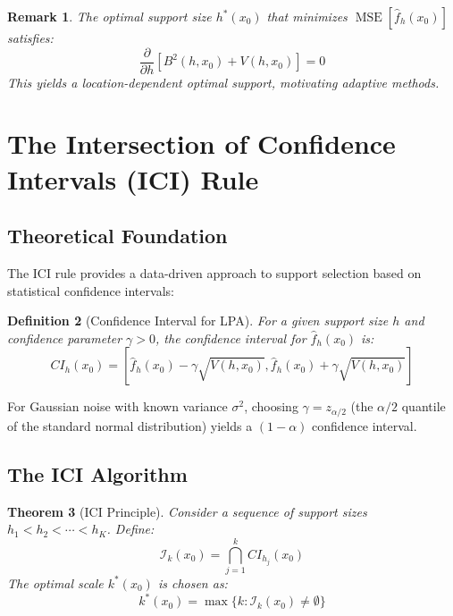 \documentclass[12pt]{article}
\DeclareMathOperator{\MSE}{MSE}
\newtheorem{theorem}{Theorem}[section]
\newtheorem{definition}[theorem]{Definition}
\newtheorem{remark}[theorem]{Remark}
\begin{document}
\begin{remark}
    The optimal support size $h^*(x_0)$ that minimizes $\MSE[\hat{f}_h(x_0)]$ satisfies:
    \begin{equation}
        \frac{\partial}{\partial h} \left[ B^2(h, x_0) + V(h, x_0) \right] = 0
        \label{eq:optimal_h}
    \end{equation}
    This yields a location-dependent optimal support, motivating adaptive methods.
\end{remark}

\newpage

\section{The Intersection of Confidence Intervals (ICI) Rule}

\subsection{Theoretical Foundation}

The ICI rule provides a data-driven approach to support selection based on statistical confidence intervals:

\begin{definition}[Confidence Interval for LPA]
    For a given support size $h$ and confidence parameter $\gamma > 0$, the confidence interval for $\hat{f}_h(x_0)$ is:
    \begin{equation}
        CI_h(x_0) = \left[ \hat{f}_h(x_0) - \gamma \sqrt{V(h, x_0)}, \hat{f}_h(x_0) + \gamma \sqrt{V(h, x_0)} \right]
        \label{eq:confidence_interval}
    \end{equation}
\end{definition}

For Gaussian noise with known variance $\sigma^2$, choosing $\gamma = z_{\alpha/2}$ (the $\alpha/2$ quantile of the standard normal distribution) yields a $(1-\alpha)$ confidence interval.

\subsection{The ICI Algorithm}

\begin{theorem}[ICI Principle]
    \label{thm:ici_principle}
    Consider a sequence of support sizes $h_1 < h_2 < \cdots < h_K$. Define:
    \begin{equation}
        \mathcal{I}_k(x_0) = \bigcap_{j=1}^{k} CI_{h_j}(x_0)
        \label{eq:intersection}
    \end{equation}
    The optimal scale $k^*(x_0)$ is chosen as:
    \begin{equation}
        k^*(x_0) = \max\{k : \mathcal{I}_k(x_0) \neq \emptyset\}
        \label{eq:optimal_scale}
    \end{equation}
\end{theorem}
\end{document}
